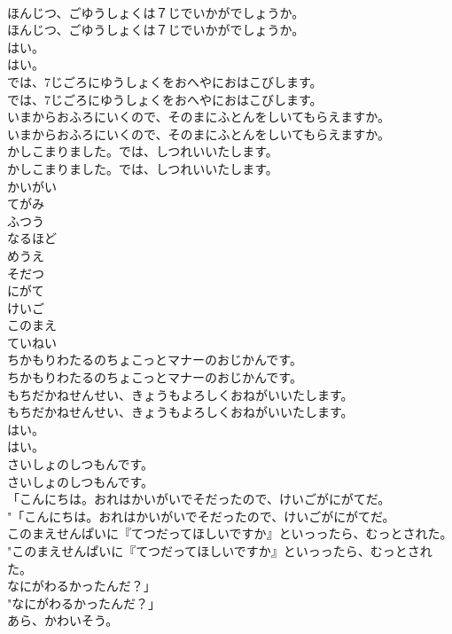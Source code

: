 \documentclass[8pt]{extreport}
\begin{document}
\begin{CJK}{UTF8}{min}
\\	ほんじつ、ごゆうしょくは７じでいかがでしょうか。	
\\	ほんじつ、ごゆうしょくは７じでいかがでしょうか。 
\\	はい。	
\\	はい。 
\\	では、7じごろにゆうしょくをおへやにおはこびします。	
\\	では、7じごろにゆうしょくをおへやにおはこびします。 
\\	いまからおふろにいくので、そのまにふとんをしいてもらえますか。	
\\	いまからおふろにいくので、そのまにふとんをしいてもらえますか。 
\\	かしこまりました。では、しつれいいたします。	
\\	かしこまりました。では、しつれいいたします。 
\\	かいがい
\\	てがみ
\\	ふつう
\\	なるほど
\\	めうえ
\\	そだつ
\\	にがて
\\	けいご
\\	このまえ
\\	ていねい
\\	ちかもりわたるのちょこっとマナーのおじかんです。	
\\	ちかもりわたるのちょこっとマナーのおじかんです。 
\\	もちだかねせんせい、きょうもよろしくおねがいいたします。	
\\	もちだかねせんせい、きょうもよろしくおねがいいたします。 
\\	はい。	
\\	はい。 
\\	さいしょのしつもんです。	
\\	さいしょのしつもんです。 
\\	「こんにちは。おれはかいがいでそだったので、けいごがにがてだ。	
\\	"「こんにちは。おれはかいがいでそだったので、けいごがにがてだ。 
\\	このまえせんぱいに『てつだってほしいですか』といっったら、むっとされた。	
\\	"このまえせんぱいに『てつだってほしいですか』といっったら、むっとされた。 
\\	なにがわるかったんだ？」	
\\	"なにがわるかったんだ？」 
\\	あら、かわいそう。	

\end{CJK}
\end{document}
